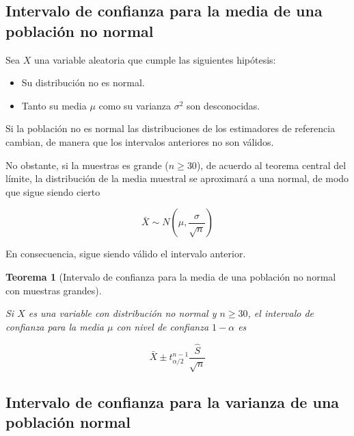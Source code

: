 \documentclass[
  a4paper,
]{scrreport}
\providecommand{\tightlist}{%
  \setlength{\itemsep}{0pt}\setlength{\parskip}{0pt}}\usepackage{longtable,booktabs,array}
\theoremstyle{definition}
\theoremstyle{definition}
\theoremstyle{plain}
\newtheorem{theorem}{Teorema}[chapter]
\theoremstyle{remark}
\begin{document}
\hypertarget{intervalo-de-confianza-para-la-media-de-una-poblaciuxf3n-no-normal}{%
\subsection{Intervalo de confianza para la media de una población no
normal}\label{intervalo-de-confianza-para-la-media-de-una-poblaciuxf3n-no-normal}}

Sea \(X\) una variable aleatoria que cumple las siguientes hipótesis:

\begin{itemize}
\tightlist
\item
  Su distribución no es normal.
\item
  Tanto su media \(\mu\) como su varianza \(\sigma^2\) son desconocidas.
\end{itemize}

Si la población no es normal las distribuciones de los estimadores de
referencia cambian, de manera que los intervalos anteriores no son
válidos.

No obstante, si la muestras es grande (\(n\geq 30\)), de acuerdo al
teorema central del límite, la distribución de la media muestral se
aproximará a una normal, de modo que sigue siendo cierto

\[
\bar X \sim N\left(\mu,\frac{\sigma}{\sqrt{n}}\right)
\]

En consecuencia, sigue siendo válido el intervalo anterior.

\begin{theorem}[Intervalo de confianza para la media de una población no
normal con muestras
grandes]\protect\hypertarget{thm-intervalo-confianza-media-no-normal}{}\label{thm-intervalo-confianza-media-no-normal}

Si \(X\) es una variable con distribución no normal y \(n\geq 30\), el
\emph{intervalo de confianza para la media} \(\mu\) con nivel de
confianza \(1-\alpha\) es

\[
\bar{X}\pm t^{n-1}_{\alpha/2}\frac{\hat{S}}{\sqrt{n}}
\]

\end{theorem}

\hypertarget{intervalo-de-confianza-para-la-varianza-de-una-poblaciuxf3n-normal}{%
\subsection{Intervalo de confianza para la varianza de una población
normal}\label{intervalo-de-confianza-para-la-varianza-de-una-poblaciuxf3n-normal}}
\end{document}

